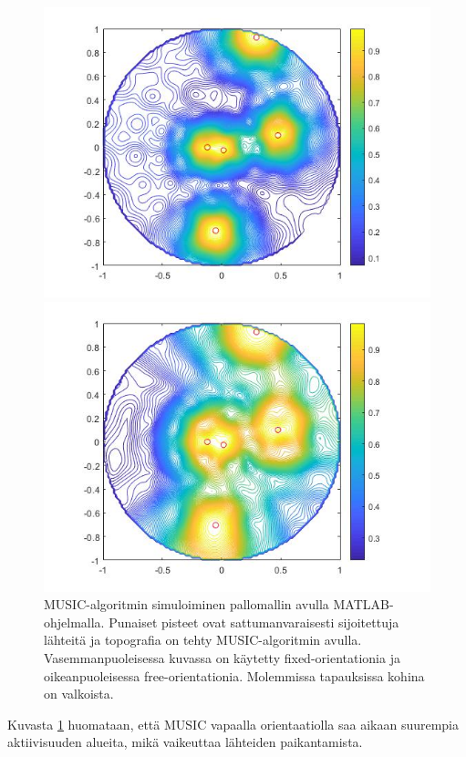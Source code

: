 \clearpage
\begin{figure}[h!]
    \centering
    \begin{minipage}{0.45\textwidth}
        \centering
        \includegraphics[width=1\textwidth]{MUSICfix.jpg}
    \end{minipage}\hfill
    \begin{minipage}{0.45\textwidth}
        \centering
        \includegraphics[width=1\textwidth]{MUSICfree.jpg} 
    \end{minipage}
    \caption{MUSIC-algoritmin simuloiminen pallomallin avulla MATLAB-ohjelmalla. Punaiset pisteet ovat sattumanvaraisesti sijoitettuja lähteitä ja topografia on tehty MUSIC-algoritmin avulla. Vasemmanpuoleisessa kuvassa on käytetty fixed-orientationia ja oikeanpuoleisessa free-orientationia. Molemmissa tapauksissa kohina on valkoista.}
    \label{fig:MUSIC}
\end{figure}

Kuvasta \ref{fig:MUSIC} huomataan, että MUSIC vapaalla orientaatiolla saa aikaan suurempia aktiivisuuden alueita, mikä vaikeuttaa lähteiden paikantamista.